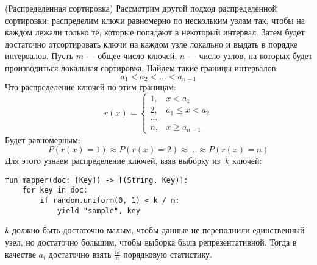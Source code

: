 \begin{algorithm}(Распределенная сортировка)
  \newline
  Рассмотрим другой подход распределенной сортировки: распределим ключи
  равномерно по нескольким узлам так, чтобы на каждом лежали только те, которые
  попадают в некоторый интервал. Затем будет достаточно отсортировать ключи на
  каждом узле локально и выдать в порядке интервалов.
  \newline
  \newline
  Пусть $m$ --- общее число ключей, $n$ --- число узлов, на которых будет
  производиться локальная сортировка. Найдем такие границы интервалов:
  $$a_1 < a_2 < \ldots < a_{n - 1}$$
  Что распределение ключей по этим границам:
  $$r(x) =
    \begin{cases}
      1, & x < a_1 \\
      2, & a_1 \leq x < a_2 \\
      \ldots \\
      n, & x \geq a_{n - 1}
    \end{cases}$$
  Будет равномерным:
  $$P(r(x) = 1) \approx P(r(x) = 2) \approx \ldots \approx P(r(x) = n)$$
  Для этого узнаем распределение ключей, взяв выборку из $~k$ ключей:
  \begin{lstlisting}
fun mapper(doc: [Key]) -> [(String, Key)]:
    for key in doc:
        if random.uniform(0, 1) < k / m:
            yield "sample", key
  \end{lstlisting}
  $k$ должно быть достаточно малым, чтобы данные не переполнили единственный
  узел, но достаточно большим, чтобы выборка была репрезентативной. Тогда в
  качестве $a_i$ достаточно взять $\frac{ik}{n}$ порядковую статистику.
\end{algorithm}

